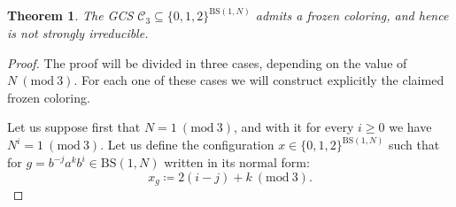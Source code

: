 \documentclass{aims}
\newcommand{\BS}[1][N]{\mathrm{BS}(1,#1)}
\newtheorem{theorem}{Theorem}[section]
\theoremstyle{definition}
\begin{document}
\begin{theorem}\label{thm:existence_frozen_3} The GCS $\mathcal{C}_3\subseteq \{0,1,2\}^{\BS}$ admits a frozen coloring, and hence is not strongly irreducible.
\end{theorem}
\begin{proof}The proof will be divided in three cases, depending on the value of $N \ (\mathrm{mod} \ 3)$. For each one of these cases we will construct explicitly the claimed frozen coloring.
	
	Let us suppose first that $N=1 \ (\mathrm{mod} \ 3)$, and with it for every $i\ge 0$ we have $N^i=1 \ (\mathrm{mod} \ 3)$.
	Let us define the configuration $x\in \{0,1,2\}^{\BS}$ such that for $g=b^{-j}a^k b^i\in \BS$ written in its normal form:
	$$
	x_g\coloneqq 2(i-j)+k \ (\mathrm{mod} \ 3).
	$$
	

\end{proof}
\end{document}
